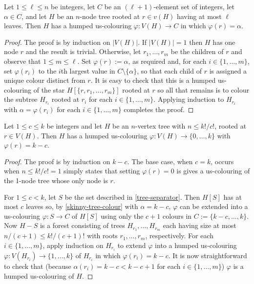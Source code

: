 \documentclass[kpfonts]{patmorin}
\begin{document}
\begin{lem}\label{skinny-tree-colour}
    Let $1\le \ell \le n$ be integers, let $C$ be an $(\ell+1)$-element set of integers, let $\alpha\in C$, and let $H$ be an $n$-node tree rooted at $r\in v(H)$ having at most $\ell$ leaves.  Then $H$ has a humped us-colouring $\varphi:V(H)\to C$ in which $\varphi(r)=\alpha$.
\end{lem}

\begin{proof}
    The proof is by induction on $|V(H)|$. If $|V(H)|=1$ then $H$ has one node $r$ and the result is trivial.  Otherwise, let $r_1,\ldots,r_m$ be the children of $r$ and observe that $1\le m\le \ell$.  Set $\varphi(r):=\alpha$, as required and, for each $i\in\{1,\ldots,m\}$, set $\varphi(r_i)$ to the $i$th largest value in $C\setminus\{\alpha\}$, so that each child of $r$ is assigned a unique colour distinct from $r$. It is easy to check that this is a humped us-colouring of the star $H[\{r,r_1,\ldots,r_m\}]$ rooted at $r$ so all that remains is to colour the subtree $H_{r_i}$ rooted at $r_i$ for each $i\in\{1,\ldots,m\}$.  Applying induction to $H_{r_i}$ with $\alpha=\varphi(r_i)$ for each $i\in\{1,\ldots,m\}$ completes the proof.
\end{proof}


\begin{lem}\label{tree-algorithm}
    Let $1\le c\le k$ be integers and let $H$ be an $n$-vertex tree with $n\le k!/c!$, rooted at $r\in V(H)$. Then $H$ has a humped us-colouring $\varphi:V(H)\to\{0,\ldots,k\}$ with $\varphi(r)=k-c$.
\end{lem}

\begin{proof}
    The proof is by induction on $k-c$.  The base case, when $c=k$, occurs when $n\le k!/c!=1$ simply states that setting $\varphi(r)=0$ is gives a us-colouring of the 1-node tree whose only node is $r$.



    For $1\le c<k$, let $S$ be the set described in \cref{tree-separator}.  Then $H[S]$ has at most $c$ leaves so, by \cref{skinny-tree-colour} with $\alpha=k-c$, $\varphi$ can be extended into a us-colouring $\varphi:S\to C$ of $H[S]$ using only the $c+1$ colours in $C:=\{k-c,\ldots,k\}$.  Now $H-S$ is a forest consisting of trees $H_{r_1},\ldots,H_{r_m}$ each having size at most $n/(c+1) \le k!/(c+1)!$ with roots $r_1,\ldots,r_m$, respectively.  For each $i\in\{1,\ldots,m\}$, apply induction on $H_{r_i}$ to extend $\varphi$ into a humped us-colouring $\varphi:V(H_{r_i})\to\{1,\ldots,k\}$ of $H_{r_i}$ in which $\varphi(r_i)=k-c$.  It is now straightforward to check that (because $\alpha(r_i)=k-c < k-c+1$ for each $i\in\{1,\ldots,m\}$) $\varphi$ is a humped us-colouring of $H$.
\end{proof}
\end{document}
